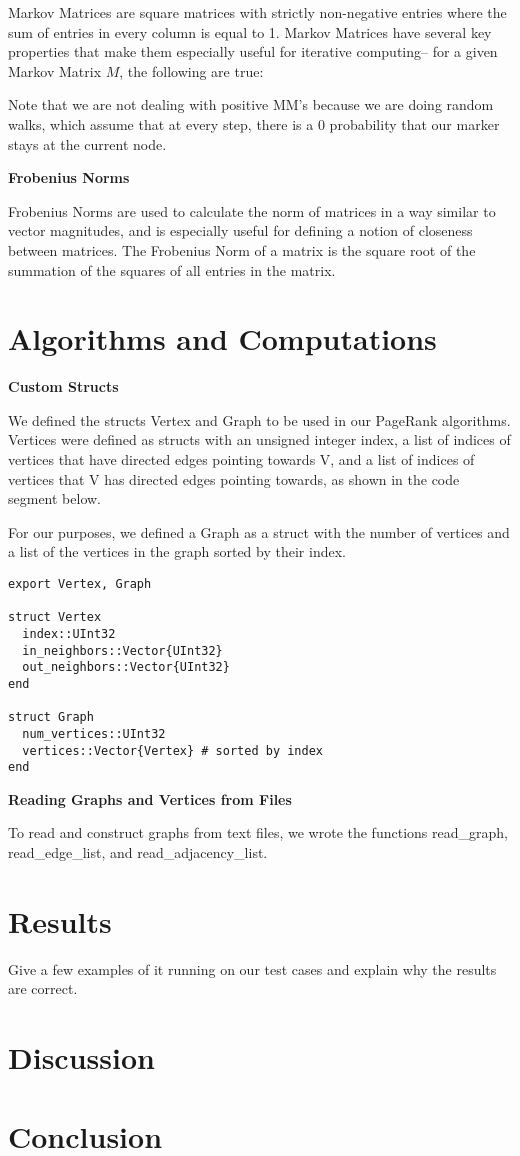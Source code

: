 \documentclass[12pt, titlepage, twoside]{amsart}
\theoremstyle{remark}
\begin{document}
Markov Matrices are square matrices with strictly non-negative entries where the sum of entries in every column is equal to 1. Markov Matrices have several key properties that make them especially useful for iterative computing-- for a given Markov Matrix $M$, the following are true:


Note that we are not dealing with positive MM's because we are doing random walks, which assume that at every step, there is a 0 probability that our marker stays at the current node.


\textbf{Frobenius Norms}

Frobenius Norms are used to calculate the norm of matrices in a way similar to vector magnitudes, and is especially useful for defining a notion of closeness between matrices. The Frobenius Norm of a matrix is the square root of the summation of the squares of all entries in the matrix.


\section{Algorithms and Computations}

\textbf{Custom Structs}

We defined the structs Vertex and Graph to be used in our PageRank algorithms. Vertices were defined as structs with an unsigned integer index, a list of indices of vertices that have directed edges pointing towards V, and a list of indices of vertices that V has directed edges pointing towards, as shown in the code segment below. 

For our purposes, we defined a Graph as a struct with the number of vertices and a list of the vertices in the graph sorted by their index.

\begin{lstlisting}
export Vertex, Graph

struct Vertex
  index::UInt32
  in_neighbors::Vector{UInt32}
  out_neighbors::Vector{UInt32}
end

struct Graph
  num_vertices::UInt32
  vertices::Vector{Vertex} # sorted by index
end
\end{lstlisting}


\textbf{Reading Graphs and Vertices from Files}

To read and construct graphs from text files, we wrote the functions read\_graph, read\_edge\_list, and read\_adjacency\_list.  
\section{Results}

Give a few examples of it running on our test cases and explain why the results are correct.

\section{Discussion}

\lipsum[1]

\section{Conclusion}

\lipsum[1]
\end{document}
